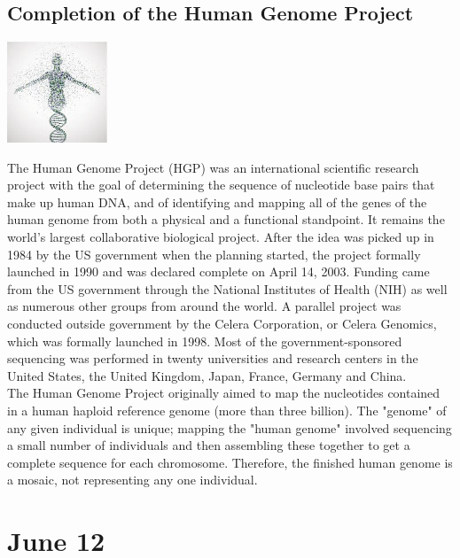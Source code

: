 \documentclass[11pt]{report}
\begin{document}
\subsection{Completion of the Human Genome Project}
\vspace{2mm}\begin{center}\includegraphics[width=3cm]{./img/HGP.jpg}\end{center}
The Human Genome Project (HGP) was an international scientific research project with the goal of determining the sequence of nucleotide base pairs that make up human DNA, and of identifying and mapping all of the genes of the human genome from both a physical and a functional standpoint. It remains the world's largest collaborative biological project. After the idea was picked up in 1984 by the US government when the planning started, the project formally launched in 1990 and was declared complete on April 14, 2003. Funding came from the US government through the National Institutes of Health (NIH) as well as numerous other groups from around the world. A parallel project was conducted outside government by the Celera Corporation, or Celera Genomics, which was formally launched in 1998. Most of the government-sponsored sequencing was performed in twenty universities and research centers in the United States, the United Kingdom, Japan, France, Germany and China.\\
\indent The Human Genome Project originally aimed to map the nucleotides contained in a human haploid reference genome (more than three billion). The "genome" of any given individual is unique; mapping the "human genome" involved sequencing a small number of individuals and then assembling these together to get a complete sequence for each chromosome. Therefore, the finished human genome is a mosaic, not representing any one individual.
\section{June 12}
\end{document}
